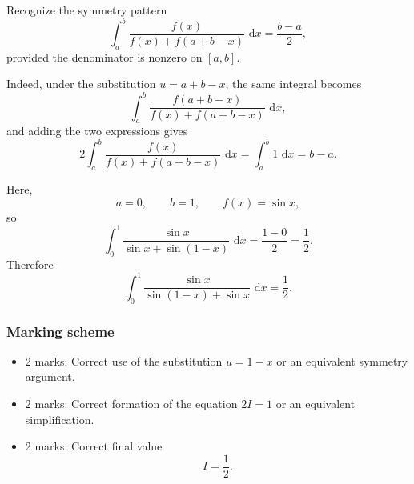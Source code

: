 \documentclass[12pt]{article}
\newcommand{\dd}{\,\mathrm{d}}
\begin{document}
Recognize the symmetry pattern
\[
\int_a^b \frac{f(x)}{f(x)+f(a+b-x)}\,\dd x=\frac{b-a}{2},
\]
provided the denominator is nonzero on \([a,b]\).

Indeed, under the substitution \(u=a+b-x\), the same integral becomes
\[
\int_a^b \frac{f(a+b-x)}{f(x)+f(a+b-x)}\,\dd x,
\]
and adding the two expressions gives
\[
2\int_a^b \frac{f(x)}{f(x)+f(a+b-x)}\,\dd x
=\int_a^b 1\,\dd x=b-a.
\]

Here,
\[
a=0,\qquad b=1,\qquad f(x)=\sin x,
\]
so
\[
\int_0^1 \frac{\sin x}{\sin x+\sin(1-x)}\,\dd x
=\frac{1-0}{2}
=\frac12.
\]
Therefore
\[
\boxed{
\int_0^1 \frac{\sin x}{\sin(1-x)+\sin x}\,\dd x=\frac12.
}
\]
\bigskip
\subsubsection{Marking scheme}
\begin{itemize}
\item 2 marks: Correct use of the substitution \(u=1-x\) or an equivalent symmetry argument.
\item 2 marks: Correct formation of the equation \(2I=1\) or an equivalent simplification.
\item 2 marks: Correct final value
\[
I=\frac12.
\]
\end{itemize}
\end{document}
